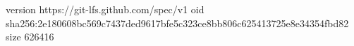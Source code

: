 version https://git-lfs.github.com/spec/v1
oid sha256:2e180608bc569c7437ded9617bfe5c323ce8bb806c625413725e8e34354fbd82
size 626416
